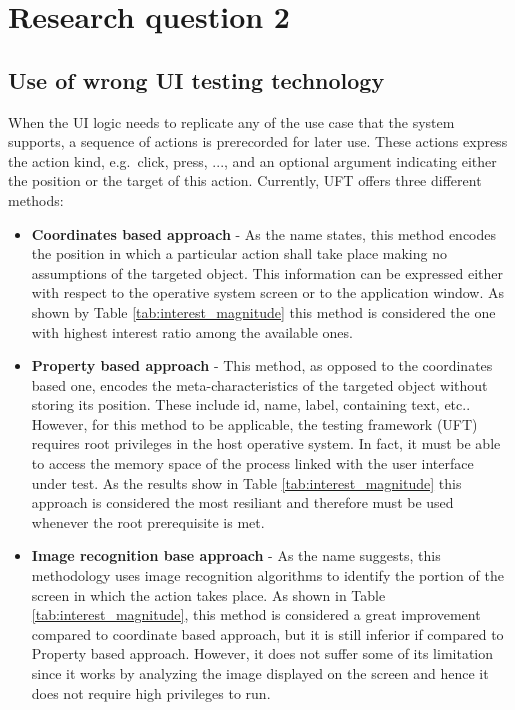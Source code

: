 \section{Research question 2} \label{sec:disc-rq2}

    \subsection{Use of wrong UI testing technology}

    When the UI logic needs to replicate any of the use case that the system supports, a sequence of actions is prerecorded for later use. These actions express the action kind, e.g.\ click, press, ..., and an optional argument indicating either the position or the target of this action. Currently, UFT offers three different methods:

\begin{itemize}

\item{\textbf{Coordinates based approach}} - As the name states, this method encodes the position in which a particular action shall take place making no assumptions of the targeted object. This information can be expressed either with respect to the operative system screen or to the application window. As shown by Table \ref{tab:interest_magnitude} this method is considered the one with highest interest ratio among the available ones.

\item{\textbf{Property based approach}} - This method, as opposed to the coordinates based one, encodes the meta-characteristics of the targeted object without storing its position. These include id, name, label, containing text, etc.. However, for this method to be applicable, the testing framework (UFT) requires root privileges in the host operative system. In fact, it must be able to access the memory space of the process linked with the user interface under test. As the results show in Table \ref{tab:interest_magnitude} this approach is considered the most resiliant and therefore must be used whenever the root prerequisite is met.

\item{\textbf{Image recognition base approach}} - As the name suggests, this methodology uses image recognition algorithms to identify the portion of the screen in which the action takes place. As shown in Table \ref{tab:interest_magnitude}, this method is considered a great improvement compared to coordinate based approach, but it is still inferior if compared to Property based approach. However, it does not suffer some of its limitation since it works by analyzing the image displayed on the screen and hence it does not require high privileges to run.

\end{itemize}

